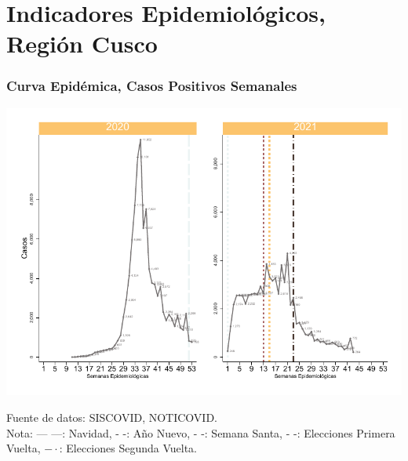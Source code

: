 \documentclass[xcolor=table]{beamer}
\begin{document}
\section{Indicadores Epidemiológicos, Región Cusco}

	\begin{frame}[label=epi_cusco]
		\frametitle{Curva Epidémica, Casos Positivos Semanales}
		\vspace{-.5cm}
		\begin{center}
			\includegraphics[width=.9\linewidth]{../figuras/positivos_20_21.pdf}
		\end{center}
		{\tiny Fuente de datos: SISCOVID, NOTICOVID. \\
			Nota: {\color{mycolor1} --- ---: Navidad}, {\color{mycolor1} - -: Año Nuevo}, {\color{mycolor2} - -: Semana Santa}, {\color{mycolor3} - -: Elecciones Primera Vuelta}, {\color{mycolor4} $- \cdot$: Elecciones Segunda Vuelta}. \\}
	\end{frame}
	
\end{document}
